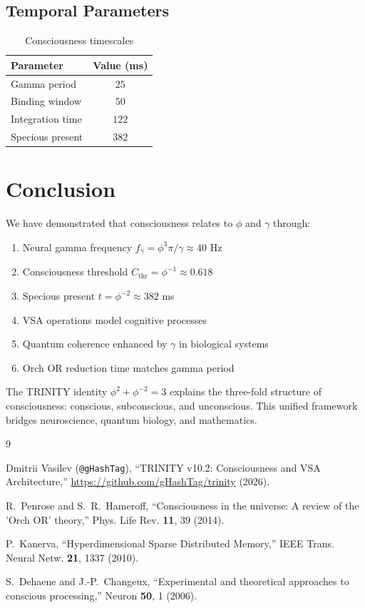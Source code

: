 \documentclass[12pt,a4paper]{article}
\begin{document}
\subsection{Temporal Parameters}

\begin{table}[h]
\centering
\begin{tabular}{lc}
\toprule
Parameter & Value (ms) \\
\midrule
Gamma period & $25$ \\
Binding window & $50$ \\
Integration time & $122$ \\
Specious present & $382$ \\
\bottomrule
\end{tabular}
\caption{Consciousness timescales}
\end{table}

\section{Conclusion}

We have demonstrated that consciousness relates to $\phi$ and $\gamma$ through:
\begin{enumerate}
\item Neural gamma frequency $f_\gamma = \phi^3\pi/\gamma \approx 40$ Hz
\item Consciousness threshold $C_{\text{thr}} = \phi^{-1} \approx 0.618$
\item Specious present $t = \phi^{-2} \approx 382$ ms
\item VSA operations model cognitive processes
\item Quantum coherence enhanced by $\gamma$ in biological systems
\item Orch OR reduction time matches gamma period
\end{enumerate}

The TRINITY identity $\phi^2 + \phi^{-2} = 3$ explains the three-fold structure of consciousness: conscious, subconscious, and unconscious. This unified framework bridges neuroscience, quantum biology, and mathematics.

\begin{thebibliography}{9}

Dmitrii Vasilev (\texttt{@gHashTag}),
``TRINITY v10.2: Consciousness and VSA Architecture,''
\url{https://github.com/gHashTag/trinity} (2026).

R.~Penrose and S.~R.~Hameroff,
``Consciousness in the universe: A review of the 'Orch OR' theory,''
Phys. Life Rev. \textbf{11}, 39 (2014).

P.~Kanerva,
``Hyperdimensional Sparse Distributed Memory,''
IEEE Trans. Neural Netw. \textbf{21}, 1337 (2010).

S.~Dehaene and J.-P.~Changeux,
``Experimental and theoretical approaches to conscious processing,''
Neuron \textbf{50}, 1 (2006).

\end{thebibliography}
\end{document}
